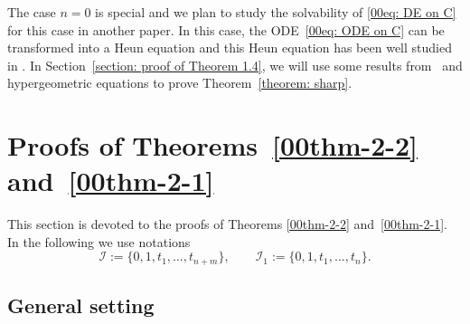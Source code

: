 \documentclass[10pt,a4paper]{amsart}
\numberwithin{equation}{section}
\def\bt{\boldsymbol t}
\begin{document}
The case $n=0$ is special and we plan to study the solvability of
\eqref{00eq: DE on C} for this case in another paper. In this case,
the ODE~\eqref{00eq: ODE on C} can be transformed into a Heun equation
and this Heun equation has been well studied in
\cite{Eremenko,Eremenko-Fuchsian}. In Section~\ref{section: proof of
 Theorem 1.4}, we will use some results from~\cite{Eremenko} and
hypergeometric equations to prove Theorem~\ref{theorem: sharp}.

\section{Proofs of Theorems~\ref{00thm-2-2} and~\ref{00thm-2-1}}\label{sec-dimension}

This section is devoted to the proofs of Theorems
\ref{00thm-2-2} and~\ref{00thm-2-1}. In the following we use notations
\[
 \mathcal{I}:=\{0,1,t_1,\dots,t_{n+m}\},\qquad
 \mathcal{I}_1:=\{0,1,t_1,\dots,t_{n}\}.
\]

\subsection{General setting}
\end{document}
